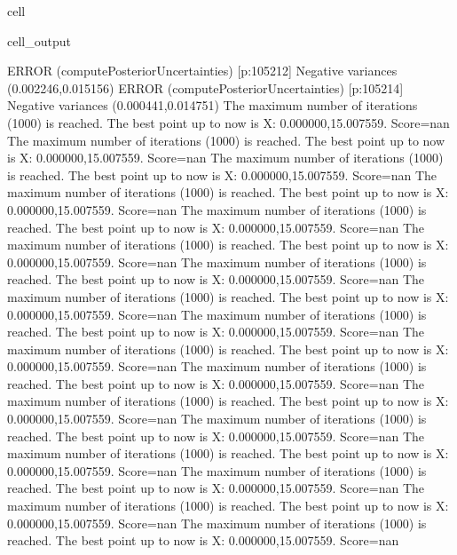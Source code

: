 \documentclass[letterpaper,10pt,english]{jupyterBook}
\begin{document}
\begin{sphinxuseclass}{cell}
\begin{sphinxVerbatimOutput}
\begin{sphinxuseclass}{cell_output}
\begin{sphinxVerbatim}[commandchars=\\\{\}]
ERROR (compute\PYGZus{}Posterior\PYGZus{}Uncertainties) [p:105212] Negative variances (\PYGZhy{}0.002246,0.015156)
ERROR (compute\PYGZus{}Posterior\PYGZus{}Uncertainties) [p:105214] Negative variances (\PYGZhy{}0.000441,0.014751)
The maximum number of iterations (1000) is reached. The best point up to now is X: \PYGZob{}0.000000,15.007559\PYGZcb{}. Score=\PYGZhy{}nan
The maximum number of iterations (1000) is reached. The best point up to now is X: \PYGZob{}0.000000,15.007559\PYGZcb{}. Score=\PYGZhy{}nan
The maximum number of iterations (1000) is reached. The best point up to now is X: \PYGZob{}0.000000,15.007559\PYGZcb{}. Score=\PYGZhy{}nan
The maximum number of iterations (1000) is reached. The best point up to now is X: \PYGZob{}0.000000,15.007559\PYGZcb{}. Score=\PYGZhy{}nan
The maximum number of iterations (1000) is reached. The best point up to now is X: \PYGZob{}0.000000,15.007559\PYGZcb{}. Score=\PYGZhy{}nan
The maximum number of iterations (1000) is reached. The best point up to now is X: \PYGZob{}0.000000,15.007559\PYGZcb{}. Score=\PYGZhy{}nan
The maximum number of iterations (1000) is reached. The best point up to now is X: \PYGZob{}0.000000,15.007559\PYGZcb{}. Score=\PYGZhy{}nan
The maximum number of iterations (1000) is reached. The best point up to now is X: \PYGZob{}0.000000,15.007559\PYGZcb{}. Score=\PYGZhy{}nan
The maximum number of iterations (1000) is reached. The best point up to now is X: \PYGZob{}0.000000,15.007559\PYGZcb{}. Score=\PYGZhy{}nan
The maximum number of iterations (1000) is reached. The best point up to now is X: \PYGZob{}0.000000,15.007559\PYGZcb{}. Score=\PYGZhy{}nan
The maximum number of iterations (1000) is reached. The best point up to now is X: \PYGZob{}0.000000,15.007559\PYGZcb{}. Score=\PYGZhy{}nan
The maximum number of iterations (1000) is reached. The best point up to now is X: \PYGZob{}0.000000,15.007559\PYGZcb{}. Score=\PYGZhy{}nan
The maximum number of iterations (1000) is reached. The best point up to now is X: \PYGZob{}0.000000,15.007559\PYGZcb{}. Score=\PYGZhy{}nan
The maximum number of iterations (1000) is reached. The best point up to now is X: \PYGZob{}0.000000,15.007559\PYGZcb{}. Score=\PYGZhy{}nan
The maximum number of iterations (1000) is reached. The best point up to now is X: \PYGZob{}0.000000,15.007559\PYGZcb{}. Score=\PYGZhy{}nan
The maximum number of iterations (1000) is reached. The best point up to now is X: \PYGZob{}0.000000,15.007559\PYGZcb{}. Score=\PYGZhy{}nan
The maximum number of iterations (1000) is reached. The best point up to now is X: \PYGZob{}0.000000,15.007559\PYGZcb{}. Score=\PYGZhy{}nan

\end{sphinxVerbatim}
\end{sphinxuseclass}
\end{sphinxVerbatimOutput}
\end{sphinxuseclass}
\end{document}
